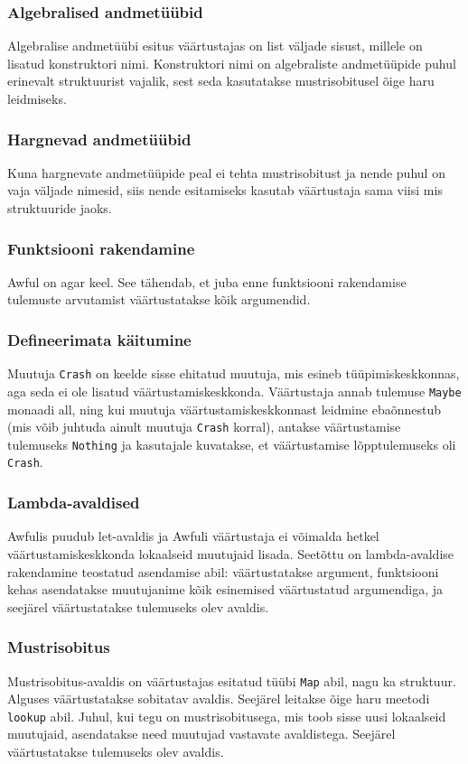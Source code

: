 \documentclass[12pt]{article}
\begin{document}
      \subsubsection{Algebralised andmetüübid}
        Algebralise andmetüübi esitus väärtustajas on list väljade sisust, millele on lisatud konstruktori nimi. Konstruktori nimi on algebraliste andmetüüpide puhul erinevalt struktuurist vajalik, sest seda kasutatakse mustrisobitusel õige haru leidmiseks.
      \subsubsection{Hargnevad andmetüübid}
        Kuna hargnevate andmetüüpide peal ei tehta mustrisobitust ja nende puhul on vaja väljade nimesid, siis nende esitamiseks kasutab väärtustaja sama viisi mis struktuuride jaoks.
      \subsubsection{Funktsiooni rakendamine}
        Awful on agar keel. See tähendab, et juba enne funktsiooni rakendamise tulemuste arvutamist väärtustatakse kõik argumendid.
      \subsubsection{Defineerimata käitumine}
        Muutuja \verb!Crash! on keelde sisse ehitatud muutuja, mis esineb tüüpimiskeskkonnas, aga seda ei ole lisatud väärtustamiskeskkonda. Väärtustaja annab tulemuse \verb!Maybe! monaadi all, ning kui muutuja väärtustamiskeskkonnast leidmine ebaõnnestub (mis võib juhtuda ainult muutuja \verb!Crash! korral), antakse väärtustamise tulemuseks \verb!Nothing! ja kasutajale kuvatakse, et väärtustamise lõpptulemuseks oli \verb!Crash!.
      \subsubsection{Lambda-avaldised}
        Awfulis puudub let-avaldis ja Awfuli väärtustaja ei võimalda hetkel väärtustamiskeskkonda lokaalseid muutujaid lisada. Seetõttu on lambda-avaldise rakendamine teostatud asendamise abil: väärtustatakse argument, funktsiooni kehas asendatakse muutujanime kõik esinemised väärtustatud argumendiga, ja seejärel väärtustatakse tulemuseks olev avaldis.
      \subsubsection{Mustrisobitus}
        Mustrisobitus-avaldis on väärtustajas esitatud tüübi \verb!Map! abil, nagu ka struktuur. Alguses väärtustatakse sobitatav avaldis. Seejärel leitakse õige haru meetodi \verb!lookup! abil. Juhul, kui tegu on mustrisobitusega, mis toob sisse uusi lokaalseid muutujaid, asendatakse need muutujad vastavate avaldistega. Seejärel väärtustatakse tulemuseks olev avaldis.
\end{document}
